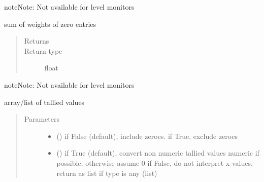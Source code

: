 \documentclass[letterpaper,10pt,english]{sphinxmanual}
\begin{document}
\begin{fulllineitems}
\begin{fulllineitems}
\begin{sphinxadmonition}{note}{Note:}
Not available for level monitors
\end{sphinxadmonition}

\end{fulllineitems}


\begin{fulllineitems}
\label{\detokenize{Reference:salabim.Monitor.weight_zero}}
sum of weights of zero entries
\begin{quote}\begin{description}
\item[{Returns}] \leavevmode
{}

\item[{Return type}] \leavevmode
float

\end{description}\end{quote}

\begin{sphinxadmonition}{note}{Note:}
Not available for level monitors
\end{sphinxadmonition}

\end{fulllineitems}


\begin{fulllineitems}
\label{\detokenize{Reference:salabim.Monitor.x}}
array/list of tallied values
\begin{quote}\begin{description}
\item[{Parameters}] \leavevmode\begin{itemize}
\item {} 
 () \textendash{} if False (default), include zeroes. if True, exclude zeroes

\item {} 
 () \textendash{} if True (default), convert non numeric tallied values numeric if possible, otherwise assume 0 
if False, do not interpret x-values, return as list if type is any (list)


\end{itemize}
\end{description}
\end{quote}
\end{fulllineitems}
\end{fulllineitems}
\end{document}
